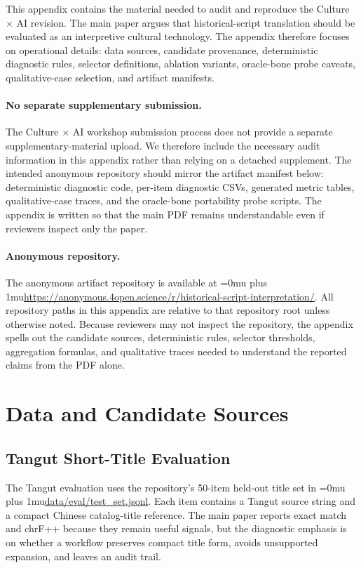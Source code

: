 \documentclass{article}
\newcommand{\pathcode}[1]{{\begingroup\Urlmuskip=0mu plus 1mu\url{#1}\endgroup}}
\begin{document}
This appendix contains the material needed to audit and reproduce the Culture $\times$ AI revision. The main paper argues that historical-script translation should be evaluated as an interpretive cultural technology. The appendix therefore focuses on operational details: data sources, candidate provenance, deterministic diagnostic rules, selector definitions, ablation variants, oracle-bone probe caveats, qualitative-case selection, and artifact manifests.

\paragraph{No separate supplementary submission.}
The Culture $\times$ AI workshop submission process does not provide a separate supplementary-material upload. We therefore include the necessary audit information in this appendix rather than relying on a detached supplement. The intended anonymous repository should mirror the artifact manifest below: deterministic diagnostic code, per-item diagnostic CSVs, generated metric tables, qualitative-case traces, and the oracle-bone portability probe scripts. The appendix is written so that the main PDF remains understandable even if reviewers inspect only the paper.

\paragraph{Anonymous repository.}
The anonymous artifact repository is available at \pathcode{https://anonymous.4open.science/r/historical-script-interpretation/}. All repository paths in this appendix are relative to that repository root unless otherwise noted. Because reviewers may not inspect the repository, the appendix spells out the candidate sources, deterministic rules, selector thresholds, aggregation formulas, and qualitative traces needed to understand the reported claims from the PDF alone.

\section{Data and Candidate Sources}

\subsection{Tangut Short-Title Evaluation}

The Tangut evaluation uses the repository's 50-item held-out title set in \pathcode{data/eval/test_set.jsonl}. Each item contains a Tangut source string and a compact Chinese catalog-title reference. The main paper reports exact match and chrF++ because they remain useful signals, but the diagnostic emphasis is on whether a workflow preserves compact title form, avoids unsupported expansion, and leaves an audit trail.
\end{document}
